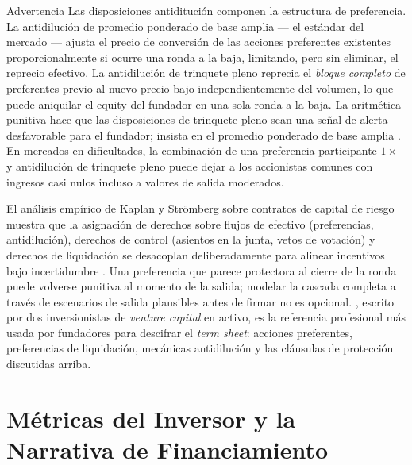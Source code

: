 \begin{admonition}{Advertencia}
Las disposiciones antiditución componen la estructura de preferencia. La antidilución de
promedio ponderado de base amplia --- el estándar del mercado --- ajusta el precio de
conversión de las acciones preferentes existentes proporcionalmente si ocurre una ronda a
la baja, limitando, pero sin eliminar, el reprecio efectivo. La antidilución de trinquete
pleno reprecia el \emph{bloque completo} de preferentes previo al nuevo precio bajo
independientemente del volumen, lo que puede aniquilar el equity del fundador en una sola
ronda a la baja. La aritmética punitiva hace que las disposiciones de trinquete pleno sean
una señal de alerta desfavorable para el fundador; insista en el promedio ponderado de base
amplia \parencite{feld2019venture}. En mercados en dificultades, la combinación de una
preferencia participante \(1\times\) y antidilución de trinquete pleno puede dejar a los
accionistas comunes con ingresos casi nulos incluso a valores de salida moderados.
\end{admonition}

El análisis empírico de Kaplan y Strömberg sobre contratos de capital de riesgo muestra que
la asignación de derechos sobre flujos de efectivo (preferencias, antidilución), derechos de
control (asientos en la junta, vetos de votación) y derechos de liquidación se desacoplan
deliberadamente para alinear incentivos bajo incertidumbre \parencite{kaplan2003financial}.
Una preferencia que parece protectora al cierre de la ronda puede volverse punitiva al
momento de la salida; modelar la cascada completa a través de escenarios de salida plausibles
antes de firmar no es opcional. \textcite{feld2022venture}, escrito por dos inversionistas de \emph{venture capital} en activo, es la referencia profesional más usada por fundadores para descifrar el \emph{term sheet}: acciones preferentes, preferencias de liquidación, mecánicas antidilución y las cláusulas de protección discutidas arriba.

\section{Métricas del Inversor y la Narrativa de Financiamiento}\label{sec:investor-metrics}

